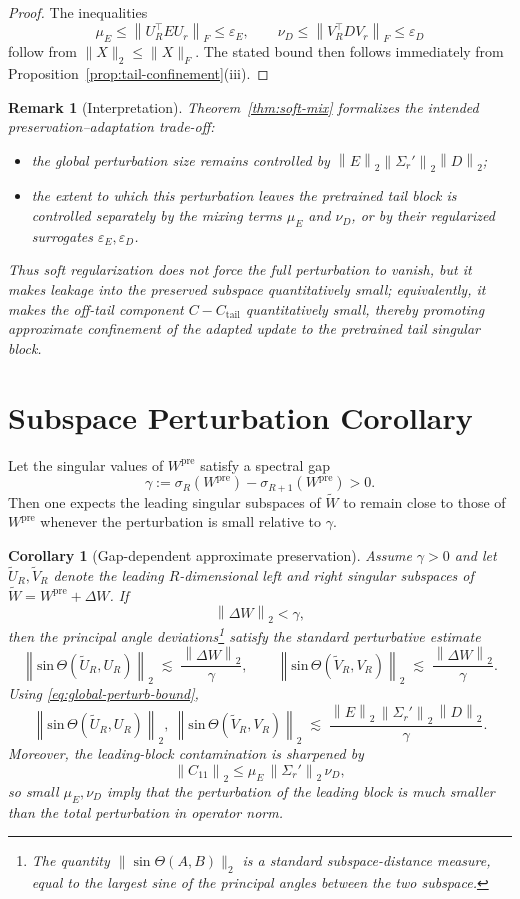 \documentclass[11pt]{article}
\newtheorem{corollary}{Corollary}
\newtheorem{remark}{Remark}
\newcommand{\fro}[1]{\left\|#1\right\|_F}
\newcommand{\op}[1]{\left\|#1\right\|_2}
\newcommand{\sinTheta}{\mathrm{sin}\,\Theta}
\begin{document}
\begin{proof}
The inequalities
\[
\mu_E \le \fro{U_R^\top E U_r}\le \varepsilon_E,
\qquad
\nu_D \le \fro{V_R^\top D V_r}\le \varepsilon_D
\]
follow from \(\|X\|_2\le \|X\|_F\). The stated bound then follows immediately from Proposition~\ref{prop:tail-confinement}(iii).
\end{proof}

\begin{remark}[Interpretation]
Theorem~\ref{thm:soft-mix} formalizes the intended preservation--adaptation trade-off:
\begin{itemize}[leftmargin=2em]
    \item the global perturbation size remains controlled by \(\op{E}\op{\Sigma_r'}\op{D}\);
    \item the extent to which this perturbation leaves the pretrained tail block is controlled separately by the mixing terms \(\mu_E\) and \(\nu_D\), or by their regularized surrogates \(\varepsilon_E,\varepsilon_D\).
\end{itemize}
Thus soft regularization does not force the full perturbation to vanish, but it makes leakage into the preserved subspace quantitatively small; equivalently, it makes the off-tail component \(C-C_{\mathrm{tail}}\) quantitatively small, thereby promoting approximate confinement of the adapted update to the pretrained tail singular block.
\end{remark}

\section{Subspace Perturbation Corollary}
Let the singular values of \(W^{\mathrm{pre}}\) satisfy a spectral gap
\[
\gamma := \sigma_R(W^{\mathrm{pre}}) - \sigma_{R+1}(W^{\mathrm{pre}}) > 0.
\]
Then one expects the leading singular subspaces of \(\widetilde W\) to remain close to those of \(W^{\mathrm{pre}}\) whenever the perturbation is small relative to \(\gamma\).

\begin{corollary}[Gap-dependent approximate preservation]
\label{cor:subspace}
Assume \(\gamma>0\) and let \(\widetilde U_R,\widetilde V_R\) denote the leading \(R\)-dimensional left and right singular subspaces of \(\widetilde W = W^{\mathrm{pre}} + \Delta W\). If
\[
\op{\Delta W} < \gamma,
\]
then the principal angle deviations\footnote{The quantity \(\|\sin\Theta(A,B)\|_2\) is a standard subspace-distance measure, equal to the largest sine of the principal angles between the two subspace.} satisfy the standard perturbative estimate
\[
\op{\sinTheta(\widetilde U_R,U_R)}
\;\lesssim\;
\frac{\op{\Delta W}}{\gamma},
\qquad
\op{\sinTheta(\widetilde V_R,V_R)}
\;\lesssim\;
\frac{\op{\Delta W}}{\gamma}.
\]
Using \eqref{eq:global-perturb-bound},
\[
\op{\sinTheta(\widetilde U_R,U_R)},
\ \op{\sinTheta(\widetilde V_R,V_R)}
\;\lesssim\;
\frac{\op{E}\,\op{\Sigma_r'}\,\op{D}}{\gamma}.
\]
Moreover, the leading-block contamination is sharpened by
\[
\op{C_{11}}
\le
\mu_E\,\op{\Sigma_r'}\,\nu_D,
\]
so small \(\mu_E,\nu_D\) imply that the perturbation of the leading block is much smaller than the total perturbation in operator norm.
\end{corollary}
\end{document}
